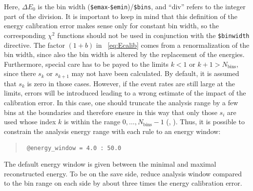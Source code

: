Here, $\Delta E_0$ is the bin width ({\tt \$emax}-{\tt \$emin})/{\tt \$bins},
and ``div'' refers to the integer part of the division. It is important
to keep in mind that this definition of the energy calibration error 
makes sense only for constant bin width, so the corresponding $\chi^2$
functions should not be used in conjunction with the {\tt \$binwidth} directive.
The factor $(1+b)$ in \eq~\eqref{eq:Ecalib} comes from a renormalization of
the bin width, since also the bin width is altered by the replacement of
the energies. Furthermore, special care has to be payed to the limits
 $k<1$ or $k+1>N_\mathrm{bins}$, since there $s_k$ or $s_{k+1}$ may not have been calculated. By default, it is assumed that $s_k$ is
zero in those cases. However, if the event rates are still large at
the limits, errors will be introduced leading to a wrong
estimate of the impact of the calibration error. In this case,
one should truncate the analysis range by a few bins at the boundaries
and therefore ensure in this way that only those $s_i$ are used whose index
$k$ is within the range $0,\ldots, N_\mathrm{bins}-1$ (\cf, ). 
Thus, it is possible to constrain the analysis energy range 
with each rule to an energy window:
\begin{quote}
{\tt 
\tb @energy\_window = 4.0 : 50.0 
}
\end{quote}
The default energy window is given between the minimal and maximal reconstructed energy. To be on the save side, reduce analysis window
compared to the bin range on each side by about three times the
energy calibration error.

